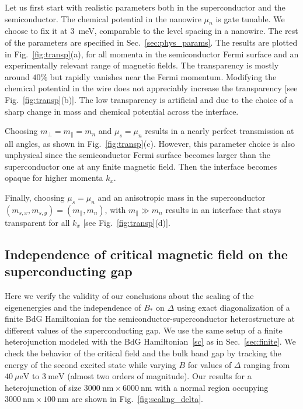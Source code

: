 Let us first start with realistic parameters both in the superconductor and the semiconductor.
The chemical potential in the nanowire $\mu_n$ is gate tunable.
We choose to fix it at \SI{3}{\meV}, comparable to the level spacing in a nanowire.
The rest of the parameters are specified in Sec.~\ref{sec:phys_params}.
The results are plotted in Fig.~\ref{fig:transp}(a), for all momenta in the semiconductor Fermi surface and an experimentally relevant range of magnetic fields.
The transparency is mostly around $40\%$ but rapidly vanishes near the Fermi momentum.
Modifying the chemical potential in the wire does not appreciably increase the transparency [see Fig.~\ref{fig:transp}(b)].
The low transparency is artificial and due to the choice of a sharp change in mass and chemical potential across the interface.

Choosing $m_\perp = m_\parallel = m_n$ and $\mu_s = \mu_n$ results in a nearly perfect transmission at all angles, as shown in Fig.~\ref{fig:transp}(c).
However, this parameter choice is also unphysical since the semiconductor Fermi surface becomes larger than the superconductor one at any finite magnetic field.
Then the interface becomes opaque for higher momenta $k_x$.

Finally, choosing $\mu_s = \mu_n$ and an anisotropic mass in the superconductor $(m_{s,x},m_{s,y})=(m_\parallel, m_n)$, with $m_\parallel \gg m_n$ results in an interface that stays transparent for all $k_x$ [see Fig.~\ref{fig:transp}(d)].

\subsection{Independence of critical magnetic field on the superconducting gap}
\label{sec:app2}

Here we verify the validity of our conclusions about the scaling of the eigenenergies and the independence of $B_*$ on $\Delta$ using exact diagonalization of a finite BdG Hamiltonian for the semiconductor-superconductor heterostructure at different values of the superconducting gap.
We use the same setup of a finite heterojunction modeled with the BdG Hamiltonian~\eqref{sc} as in Sec.~\ref{sec:finite}.
We check the behavior of the critical field and the bulk band gap by tracking the energy of the second excited state while varying $B$ for values of $\Delta$ ranging from $\SI{40}{\mu\eV}$ to $\SI{3}{\meV}$ (almost two orders of magnitude).
Our results for a heterojunction of size $\SI{3000}{\nm}\times\SI{6000}{\nm}$ with a normal region occupying $\SI{3000}{\nm}\times\SI{100}{\nm}$ are shown in Fig.~\ref{fig:scaling_delta}.

